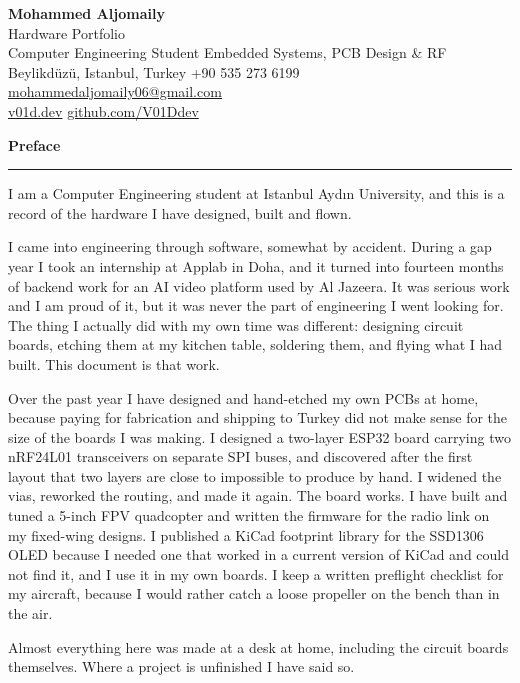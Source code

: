 \documentclass[11pt,a4paper]{article}
\newcommand{\entry}[2]{%
  \vspace{6pt}%
  {\Large\bfseries #1}\hfill{\itshape\small #2}\par
  \vspace{3pt}\hrule\vspace{4pt}%
}
\begin{document}
\begin{center}
    {\LARGE \textbf{Mohammed Aljomaily}}\\[3pt]
    {\large Hardware Portfolio}\\[6pt]
    {\small Computer Engineering Student \textbar{} Embedded Systems, PCB Design \& RF}\\[3pt]
    {\small Beylikd\"uz\"u, Istanbul, Turkey \textbar{} +90 535 273 6199 \textbar{}
    \href{mailto:mohammedaljomaily06@gmail.com}{mohammedaljomaily06@gmail.com}}\\[2pt]
    {\small \href{https://v01d.dev}{v01d.dev} \textbar{} \href{https://github.com/V01Ddev}{github.com/V01Ddev}}
\end{center}

\entry{Preface}{}

I am a Computer Engineering student at Istanbul Ayd{\i}n University, and this is
a record of the hardware I have designed, built and flown.

I came into engineering through software, somewhat by accident. During a gap
year I took an internship at Applab in Doha, and it turned into fourteen months
of backend work for an AI video platform used by Al Jazeera. It was serious work
and I am proud of it, but it was never the part of engineering I went looking
for. The thing I actually did with my own time was different: designing circuit
boards, etching them at my kitchen table, soldering them, and flying what I had
built. This document is that work.

Over the past year I have designed and hand-etched my own PCBs at home, because
paying for fabrication and shipping to Turkey did not make sense for the size of
the boards I was making. I designed a two-layer ESP32 board carrying two
nRF24L01 transceivers on separate SPI buses, and discovered after the first
layout that two layers are close to impossible to produce by hand. I widened the
vias, reworked the routing, and made it again. The board works. I have built and
tuned a 5-inch FPV quadcopter and written the firmware for the radio link on my
fixed-wing designs. I published a KiCad footprint library for the SSD1306 OLED
because I needed one that worked in a current version of KiCad and could not
find it, and I use it in my own boards. I keep a written preflight checklist for
my aircraft, because I would rather catch a loose propeller on the bench than in
the air.

Almost everything here was made at a desk at home, including the circuit boards
themselves. Where a project is unfinished I have said so.
\end{document}
